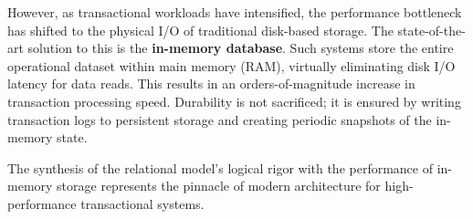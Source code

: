 However, as transactional workloads have intensified, the performance bottleneck has shifted to the physical I/O of traditional disk-based storage. The state-of-the-art solution to this is the \textbf{in-memory database}. Such systems store the entire operational dataset within main memory (RAM), virtually eliminating disk I/O latency for data reads. This results in an orders-of-magnitude increase in transaction processing speed. Durability is not sacrificed; it is ensured by writing transaction logs to persistent storage and creating periodic snapshots of the in-memory state.

The synthesis of the relational model's logical rigor with the performance of in-memory storage represents the pinnacle of modern architecture for high-performance transactional systems.